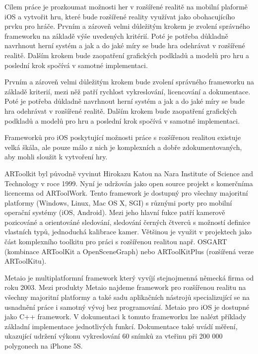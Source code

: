 \documentclass[oneside,12pt]{article}
\begin{document}
Cílem práce je prozkoumat možnosti her v rozšířené realitě na mobilní plaformě iOS a vytvořit hru, které bude rozšířené reality využívat jako obohacujícího prvku pro hráče. Prvním a zároveň velmi důležitým krokem je zvolení správného frameworku na základě výše uvedených kritérií. Poté je potřeba důkladně navrhnout herní systém a jak a do jaké míry se bude hra odehrávat v rozšířené realitě. Dalším krokem bude zaopatření grafických podkladů a modelů pro hru a poslední krok spočívá v samotné implementaci.

Prvním a zároveň velmi důležitým krokem bude zvolení správného frameworku na základě kriterií, mezi něž patří rychlost vykreslování, licencování a dokumentace. Poté je potřeba důkladně navrhnout herní systém a jak a do jaké míry se bude hra odehrávat v rozšířené realitě. Dalším krokem bude zaopatření grafických podkladů a modelů pro hru a poslední krok spočívá v samotné implementaci.


Frameworků pro iOS poskytující možnosti práce s rozšířenou realitou existuje velká škála, ale pouze málo z nich je komplexních a dobře zdokumentovaných, aby mohli sloužit k vytvoření hry.

ARToolkit byl původně vyvinut Hirokazu Katou na Nara Institute of Science and Technology v roce 1999. Nyní je udržován jako open source projekt s komerčníma licencema od ARToolWork. Tento framework je dostupný pro všechny majoritní platformy (Windows, Linux, Mac OS X, SGI) s různými porty pro mobilní operační systémy (iOS, Android). Mezi jeho hlavní fukce patří kamerově pozicováné a orientováné sledování, sledování černých čtverců s možností definice vlastních typů, jednoduchá kalibrace kamer. Většinou je využit v projektech jako část komplexního toolkitu pro práci s rozšířenou realitou např. OSGART (kombinace ARToolKit a OpenSceneGraph) nebo ARToolKitPlus (rozšířená verze ARToolKitu).

Metaio je multiplatformní framework který vyvíjí stejnojmenná německá firma od roku 2003. Mezi produkty Metaio najdeme framework pro rozšířenou realitu na všechny majoritní platformy a také sadu aplikačních nástrojů specializující se na usnadnění práce i samotný vývoj bez programování. Metaio pro iOS je dostupné jako C++ framework. V dokumentaci k tomuto frameworku lze nalézt příklady základní implementace jednotlivých funkcí.
Dokumentace také uvádí měření, ukazující udržení výkonu vykreslování 60 snímků za vteřinu při 200 000 polygonech na iPhone 5S.
\end{document}
